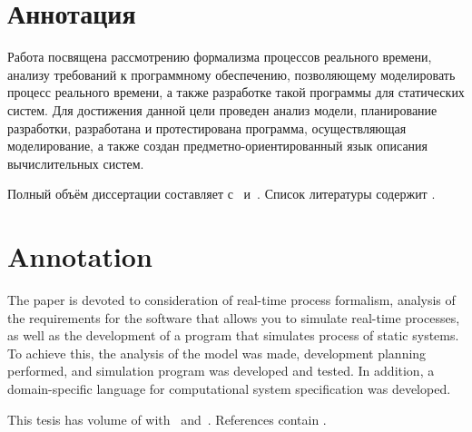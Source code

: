 \section*{Аннотация}
Работа посвящена рассмотрению формализма процессов реального времени, анализу требований к программному обеспечению, позволяющему моделировать процесс реального времени, а также разработке такой программы для статических систем. Для достижения данной цели проведен анализ модели, планирование разработки, разработана и протестирована программа, осуществляющая моделирование, а также создан предметно-ориентированный язык описания вычислительных систем.

Полный объём диссертации составляет  
с~
и~. Список литературы содержит  
.
\section*{Annotation}
The paper is devoted to consideration of real-time process formalism,
analysis of the requirements for the software that allows you to simulate real-time processes, as well as the development of a program that simulates process of static systems. To achieve this, the analysis of the model was made, development planning performed, and simulation program was developed and tested.
In addition, a domain-specific language for computational system specification was developed.


This tesis has volume of  
with~
and~. References contain
.